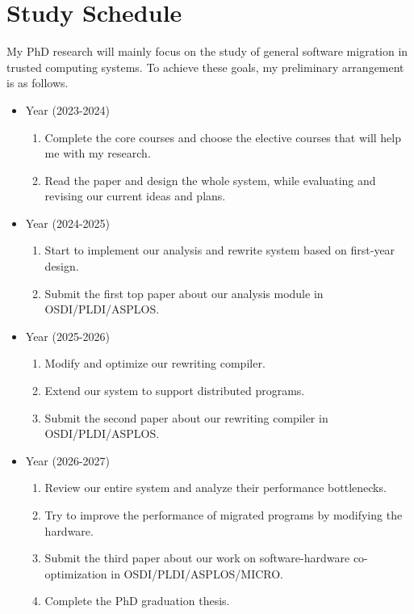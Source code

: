 \section{Study Schedule}
My PhD research will mainly focus on the study of general software migration in trusted computing systems.
To achieve these goals, my preliminary arrangement is as follows.
\begin{itemize}
    \item {} Year (2023-2024)
    \begin{enumerate}
        \item Complete the core courses and choose the elective courses
        that will help me with my research.
        \item Read the paper and design the whole system, while evaluating and revising
        our current ideas and plans.
    \end{enumerate}
    \item {} Year (2024-2025)
        \begin{enumerate}
            \item Start to implement our analysis and rewrite system based on
            first-year design.
            \item Submit the first top paper about our analysis module in OSDI/PLDI/ASPLOS.
        \end{enumerate}
    \item {} Year (2025-2026)
        \begin{enumerate}
            \item Modify and optimize our rewriting compiler.
            \item Extend our system to support distributed programs.
            \item Submit the second paper about our rewriting compiler in OSDI/PLDI/ASPLOS.
        \end{enumerate}
    \item {} Year (2026-2027)
        \begin{enumerate}
            \item Review our entire system and analyze their performance bottlenecks.
            \item Try to improve the performance of migrated programs by
            modifying the hardware.
            \item Submit the third paper about our work on software-hardware co-optimization in OSDI/PLDI/ASPLOS/MICRO.
            \item Complete the PhD graduation thesis.
        \end{enumerate}
\end{itemize}

